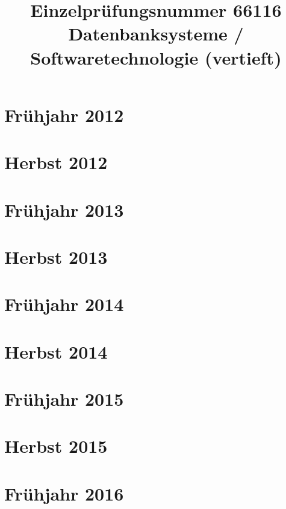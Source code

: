 \documentclass{lehramt-informatik-examen-sammlung}
\title{Einzelprüfungsnummer 66116\\Datenbanksysteme / Softwaretechnologie (vertieft)}
\begin{document}
\maketitle
\tableofcontents

\section{Frühjahr 2012}


\section{Herbst 2012}


\section{Frühjahr 2013}


\section{Herbst 2013}


\section{Frühjahr 2014}


\section{Herbst 2014}


\section{Frühjahr 2015}


\section{Herbst 2015}


\section{Frühjahr 2016}

\end{document}
